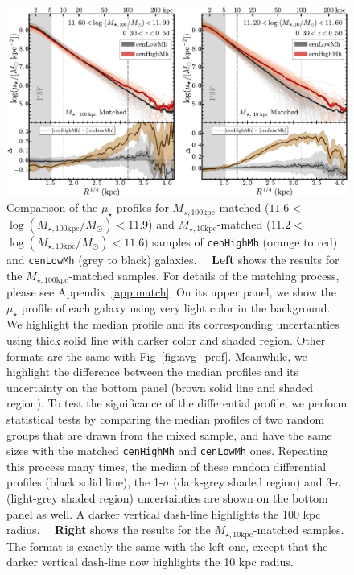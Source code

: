 \documentclass{emulateapj}
\def\rbcg{\texttt{cenHighMh}}
\def\nbcg{\texttt{cenLowMh}}
\def\minn{{$M_{\star,10\mathrm{kpc}}$}}
\def\mtot{{$M_{\star,100\mathrm{kpc}}$}}
\def\logminn{{$\log (M_{\star,10\mathrm{kpc}}/M_{\odot})$}}
\def\logmtot{{$\log (M_{\star,100\mathrm{kpc}}/M_{\odot})$}}
\def\mden{{$\mu_{\star}$}}
\begin{document}
\begin{CJK*}{UTF8}{gbsn}
  \begin{figure}[t!]
      \centering 
      \includegraphics[width=\textwidth]{fig/redbcg_prof_1}
      \caption{
          Comparison of the \mden{} profiles for \mtot{}-matched 
          ($11.6<$\logmtot{}$<11.9$) and \minn{}-matched ($11.2<$\logminn{}$<11.6$) 
          samples of \rbcg{} (orange to red) and \nbcg{} (grey to black) galaxies.~~
          \textbf{Left} shows the results for the \mtot{}-matched samples.
          For details of the matching process, please see Appendix~\ref{app:match}.  
          On its upper panel, we show the \mden{} profile of each galaxy using very light 
          color in the background.  
          We highlight the median profile and its corresponding uncertainties using thick 
          solid line with darker color and shaded region. 
          Other formats are the same with Fig~\ref{fig:avg_prof}.
          Meanwhile, we highlight the difference between the median profiles and its 
          uncertainty on the bottom panel (brown solid line and shaded region).
          To test the significance of the differential profile, we perform statistical
          tests by comparing the median profiles of two random groups that are drawn 
          from the mixed sample, and have the same sizes with the matched \rbcg{} and
          \nbcg{} ones.
          Repeating this process many times, the median of these random differential 
          profiles (black solid line), the 1-$\sigma$ (dark-grey shaded region) and 
          3-$\sigma$ (light-grey shaded region) uncertainties are shown on the bottom 
          panel as well. 
          A darker vertical dash-line highlights the 100 kpc radius.~~
          \textbf{Right} shows the results for the \minn{}-matched samples. 
          The format is exactly the same with the left one, except that the darker 
          vertical dash-line now highlights the 10 kpc radius.
          }
      \label{fig:prof_1} 
  \end{figure}


\end{CJK*}
\end{document}
